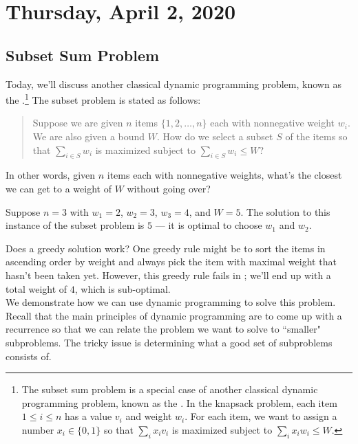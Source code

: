 \newpage
\section{Thursday, April 2, 2020} 

\subsection{Subset Sum Problem}

Today, we'll discuss another classical dynamic programming problem, known as the .\footnote{The subset sum problem is a special case of another classical dynamic programming problem, known as the . In the knapsack problem, each item $1 \leq i \leq n$ has a value $v_i$ and weight $w_i$. For each item, we want to assign a number $x_i \in \{0, 1\}$ so that $\sum_{i}x_iv_i$ is maximized subject to $\sum_{i} x_i w_i \leq W$. } The subset problem is stated as follows:

\begin{quote}
    Suppose we are given $n$ items $\{1, 2, \ldots, n\}$ each with nonnegative weight $w_i$. We are also given a bound $W$. How do we select a subset $S$ of the items so that $\sum_{i\in S} w_i$ is maximized subject to $\sum_{i\in S} w_i \leq W$?
\end{quote}

In other words, given $n$ items each with nonnegative weights, what's the closest we can get to a weight of $W$ without going over?  \\

\begin{example}
 Suppose $n = 3$ with $w_1 = 2$, $w_2 = 3$, $w_3 = 4$, and $W = 5$. The solution to this instance of the subset problem is $\boxed{5}$ --- it is optimal to choose $w_1$ and $w_2$. 
\label{greedy:01}
\end{example}

Does a greedy solution work? One greedy rule might be to sort the items in ascending order by weight and always pick the item with maximal weight that hasn't been taken yet. However, this greedy rule fails in ; we'll end up with a total weight of $4$, which is sub-optimal. \\

We demonstrate how we can use dynamic programming to solve this problem. Recall that the main principles of dynamic programming are to come up with a recurrence so that we can relate the problem we want to solve to ``smaller" subproblems. The tricky issue is determining what a good set of subproblems consists of. \\

